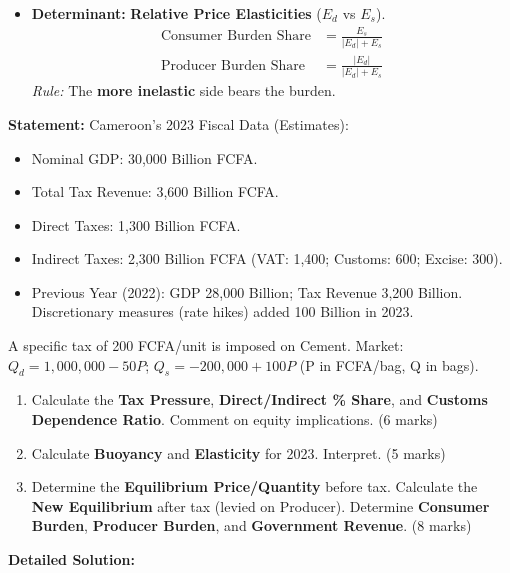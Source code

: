 \documentclass[11pt]{article}
\begin{document}
\begin{methode}
\begin{enumerate}
\begin{itemize}
        \item \textbf{Determinant:} \textbf{Relative Price Elasticities} ($E_d$ vs $E_s$). 
        \begin{align*}
            \text{Consumer Burden Share} &= \frac{E_s}{|E_d| + E_s} \\
            \text{Producer Burden Share} &= \frac{|E_d|}{|E_d| + E_s}
        \end{align*}
        \textit{Rule:} The \textbf{more inelastic} side bears the burden.
    \end{itemize}
\end{enumerate}
\end{methode}

\begin{exoresolu}
\textbf{Statement:}
Cameroon's 2023 Fiscal Data (Estimates):
\begin{itemize}
    \item Nominal GDP: 30,000 Billion FCFA.
    \item Total Tax Revenue: 3,600 Billion FCFA.
    \item Direct Taxes: 1,300 Billion FCFA.
    \item Indirect Taxes: 2,300 Billion FCFA (VAT: 1,400; Customs: 600; Excise: 300).
    \item Previous Year (2022): GDP 28,000 Billion; Tax Revenue 3,200 Billion. Discretionary measures (rate hikes) added 100 Billion in 2023.
\end{itemize}
A specific tax of 200 FCFA/unit is imposed on Cement. Market: $Q_d = 1,000,000 - 50P$; $Q_s = -200,000 + 100P$ (P in FCFA/bag, Q in bags).
\begin{enumerate}
    \item Calculate the \textbf{Tax Pressure}, \textbf{Direct/Indirect \% Share}, and \textbf{Customs Dependence Ratio}. Comment on equity implications. (6 marks)
    \item Calculate \textbf{Buoyancy} and \textbf{Elasticity} for 2023. Interpret. (5 marks)
    \item Determine the \textbf{Equilibrium Price/Quantity} before tax. Calculate the \textbf{New Equilibrium} after tax (levied on Producer). Determine \textbf{Consumer Burden}, \textbf{Producer Burden}, and \textbf{Government Revenue}. (8 marks)
\end{enumerate}
\tcblower
\textbf{Detailed Solution:}


\end{exoresolu}
\end{document}
